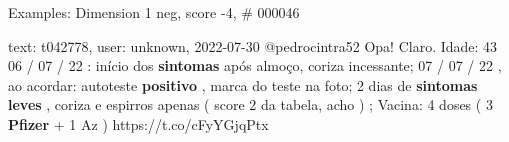 \begin{frame}{Examples: Dimension 1 neg, score -4, \# 000046}
\footnotesize
\begin{alertblock}{text: t042778, user: unknown, 2022-07-30}
@pedrocintra52 Opa! Claro. Idade: 43 06 / 07 / 22 : início dos 
\textbf{sintomas} após almoço, coriza incessante; 07 / 07 / 22 , ao acordar: 
autoteste \textbf{positivo} , marca do teste na foto; 2 dias de 
\textbf{sintomas} \textbf{leves} , coriza e espirros apenas ( score 2 da 
tabela, acho ) ; Vacina: 4 doses ( 3 \textbf{Pfizer} + 1 Az ) 
https://t.co/cFyYGjqPtx 
\end{alertblock}
\end{frame}
